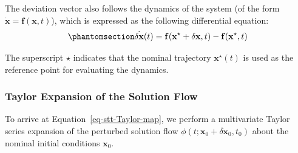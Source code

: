 \documentclass[
  letterpaper,
  DIV=11,
  numbers=noendperiod,
  oneside]{scrartcl}
\begin{document}
The deviation vector also follows the dynamics of the system (of the
form \(\dot{\mathbf{x}} = \mathbf{f}(\mathbf{x}, t)\)), which is
expressed as the following differential equation:
\begin{equation}\protect\phantomsection\label{eq-stt-eom}{
\dot{\delta \mathbf{x}}(t) = \mathbf{f}(\mathbf{x}^\star+\delta \mathbf{x}, t) - \mathbf{f}(\mathbf{x}^\star, t)
}\end{equation}

The superscript \(\star\) indicates that the nominal trajectory
\(\mathbf{x}^\star(t)\) is used as the reference point for evaluating
the dynamics.

\subsubsection{Taylor Expansion of the Solution
Flow}\label{taylor-expansion-of-the-solution-flow}

To arrive at Equation~\ref{eq-stt-Taylor-map}, we perform a multivariate
Taylor series expansion of the perturbed solution flow
\(\phi(t; \mathbf{x}_0 + \delta \mathbf{x}_0, t_0)\) about the nominal
initial conditions \(\mathbf{x}_0\).
\end{document}
